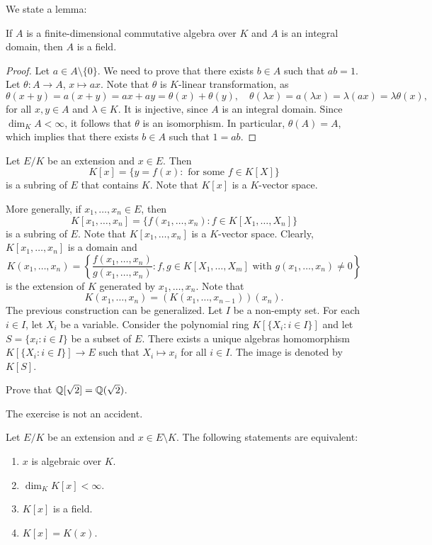 We state a lemma:

\begin{lemma}
If $A$ is a finite-dimensional commutative algebra over $K$ 
and $A$ is an integral domain, then $A$ is a field. 
\end{lemma}

\begin{proof}
	Let $a\in A\setminus\{0\}$. We need to prove that there exists $b\in A$
	such that $ab=1$. Let $\theta\colon A\to A$, $x\mapsto ax$. Note that 
	$\theta$ is $K$-linear transformation, as 
    \[
    \theta(x+y)=a(x+y)=ax+ay=\theta(x)+\theta(y),\quad
    \theta(\lambda x)=a(\lambda x)=\lambda (ax)=\lambda\theta(x),
    \]
    for all $x,y\in A$ and $\lambda\in K$. 
 It is injective, since $A$ is an
	integral domain.  Since $\dim_KA<\infty$, it follows that $\theta$ is an
	isomorphism. In particular, $\theta(A)=A$, which implies that there exists
	$b\in A$ such that $1=ab$. 
\end{proof}

Let $E/K$ be an extension and $x\in E$. 
Then 
\[
K[x]=\{y=f(x):\text{ for some $f\in K[X]$}\}
\]
is a subring of $E$ that contains $K$. Note that 
$K[x]$ is a $K$-vector space. 

More generally,
if $x_1,\dots,x_n\in E$, then
\[
K[x_1,\dots,x_n]=\{f(x_1,\dots,x_n):f\in K[X_1,\dots,X_n]\}
\]
is a subring of $E$. 
Note that $K[x_1,\dots,x_n]$ is a $K$-vector space. 
Clearly, $K[x_1,\dots,x_n]$ is a domain
and 
\[
K(x_1,\dots,x_n)=\left\{\frac{f(x_1,\dots,x_n)}{g(x_1,\dots,x_n)}:f,g\in K[X_1,\dots,X_m]\text{ with $g(x_1,\dots,x_n)\ne 0$}\right\}
\]
is the extension of $K$ generated by $x_1,\dots,x_n$. 
Note that 
\[
K(x_1,\dots,x_n)=(K(x_1,\dots,x_{n-1}))(x_n).
\]
The previous construction
can be generalized. Let $I$ be a non-empty set. 
For each $i\in I$, let $X_i$ be a variable. Consider
the polynomial ring $K[\{X_i:i\in I\}]$ and let 
$S=\{x_i:i\in I\}$ be a subset of $E$. There exists a unique 
algebras homomorphism $K[\{X_i:i\in I\}]\to E$ 
such that $X_i\mapsto x_i$ for all $i\in I$. The image 
is denoted by $K[S]$. 

\begin{exercise}
    Prove that $\mathbb{Q}[\sqrt{2}]=\mathbb{Q}(\sqrt{2})$. 
\end{exercise}

The exercise is not an accident. 

\begin{theorem}
	Let $E/K$ be an extension and $x\in E\setminus K$.
	The following statements are equivalent:
	\begin{enumerate}
		\item $x$ is algebraic over $K$.
		\item $\dim_KK[x]<\infty$.
		\item $K[x]$ is a field.
		\item $K[x]=K(x)$. 
	\end{enumerate}
\end{theorem}

